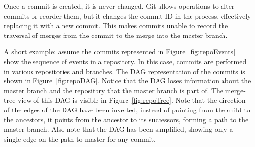\documentclass[draft]{IEEEtran}
\begin{document}
Once a commit is created, it is never changed. Git allows operations to
alter commits or reorder them, but it changes the commit ID in the
process, effectively replacing it with a new commit. This makes commits
unable to record the traversal of merges from the commit to the merge
into the master branch.

A short example: assume the commits represented in
Figure~\ref{fig:repoEvents} show the sequence of events in a repository.
In this case, commits are performed in various repositories and
branches. The DAG representation of the commits is shown in
Figure~\ref{fig:repoDAG}. Notice that the DAG loses information about
the master branch and the repository that the master branch is part of.
The merge-tree view of this DAG is visible in Figure~\ref{fig:repoTree}.
Note that the direction of the edges of the DAG have been inverted,
instead of pointing from the child to the ancestors, it points from the
ancestor to its successors, forming a path to the master branch. Also
note that the DAG has been simplified, showing only a single edge on the
path to master for any commit.
\end{document}
